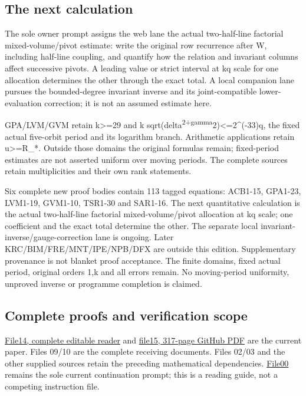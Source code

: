 \documentclass[
]{article}
\begin{document}
\subsection{The next calculation}\label{the-next-calculation}

The sole owner prompt assigns the web lane the actual two-half-line
factorial mixed-volume/pivot estimate: write the original row recurrence
after W, including half-line coupling, and quantify how the relation and
invariant columns affect successive pivots. A leading value or strict
interval at kq scale for one allocation determines the other through the
exact total. A local companion lane pursues the bounded-degree invariant
inverse and its joint-compatible lower-evaluation correction; it is not
an assumed estimate here.

GPA/LVM/GVM retain k\textgreater=29 and k
sqrt(delta\textsuperscript{2+gamma}2)\textless=2\^{}(-33)q, the fixed
actual five-orbit period and its logarithm branch. Arithmetic
applications retain \textbar u\textbar\textgreater=R\_*. Outside those
domains the original formulas remain; fixed-period estimates are not
asserted uniform over moving periods. The complete sources retain
multiplicities and their own rank statements.

Six complete new proof bodies contain 113 tagged equations: ACB1-15,
GPA1-23, LVM1-19, GVM1-10, TSR1-30 and SAR1-16. The next quantitative
calculation is the actual two-half-line factorial mixed-volume/pivot
allocation at kq scale; one coefficient and the exact total determine
the other. The separate local invariant-inverse/gauge-correction lane is
ongoing. Later KRC/BIM/FRE/MNT/IPE/NPB/DFX are outside this edition.
Supplementary provenance is not blanket proof acceptance. The finite
domains, fixed actual period, original orders 1,k and all errors remain.
No moving-period uniformity, unproved inverse or programme completion is
claimed.

\subsection{Complete proofs and verification
scope}\label{complete-proofs-and-verification-scope}

\href{https://github.com/KokunoYumeto/zeta-function-research-reader/blob/88cec321ccb455d1906d4abce7dc08bea6c7676d/workbenches/splitzero-tandem/continuations/20260915-allocation-continuation/14_CURRENT_KERNEL_AND_MULTIPLICITY_PROOFS.tex}{File14,
complete editable reader} and
\href{https://github.com/KokunoYumeto/zeta-function-research-reader/blob/88cec321ccb455d1906d4abce7dc08bea6c7676d/workbenches/splitzero-tandem/continuations/20260915-allocation-continuation/15_CURRENT_MIXED_CONTROL_READER.pdf}{file15,
317-page GitHub PDF} are the current paper. Files 09/10 are the complete
receiving documents. Files 02/03 and the other supplied sources retain
the preceding mathematical dependencies.
\href{https://github.com/KokunoYumeto/zeta-function-research-reader/blob/88cec321ccb455d1906d4abce7dc08bea6c7676d/workbenches/splitzero-tandem/continuations/20260915-allocation-continuation/00_CONTINUE_HERE.md}{File00}
remains the sole current continuation prompt; this is a reading guide,
not a competing instruction file.
\end{document}
